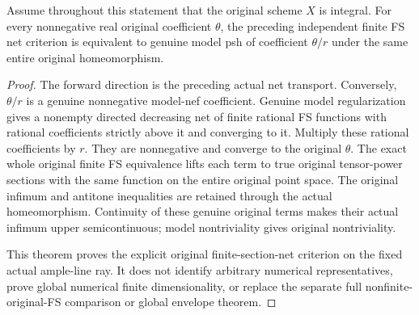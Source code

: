 \begin{theorem}
\label{thm:native-ample-model-psh-finite-fs-net-criterion}
\leanok
{}
Assume throughout this statement that the original scheme $X$ is integral.
For every nonnegative real original coefficient $\theta$, the preceding
independent finite FS net criterion is equivalent to genuine model psh of
coefficient $\theta/r$ under the same entire original homeomorphism.
\end{theorem}
\begin{proof}
The forward direction is the preceding actual net transport. Conversely,
$\theta/r$ is a genuine nonnegative model-nef coefficient. Genuine model
regularization gives a nonempty directed decreasing net of finite rational FS
functions with rational coefficients strictly above it and converging to it.
Multiply these rational coefficients by $r$. They are nonnegative and converge
to the original $\theta$. The exact whole original finite FS equivalence lifts
each term to true original tensor-power sections with the same function on the
entire original point space. The original infimum and antitone inequalities
are retained through the actual homeomorphism. Continuity of these genuine
original terms makes their actual infimum upper semicontinuous; model
nontriviality gives original nontriviality.

This theorem proves the explicit original finite-section-net criterion on the
fixed actual ample-line ray. It does not identify arbitrary numerical
representatives, prove global numerical finite dimensionality, or replace the
separate full nonfinite-original-FS comparison or global envelope theorem.
\end{proof}
